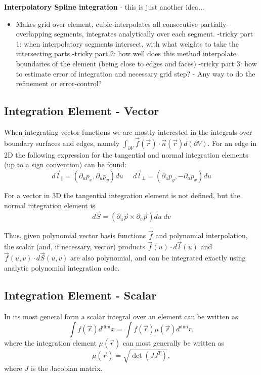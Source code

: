 \noindent
\textbf{Interpolatory Spline integration} - this is just another idea...
\begin{itemize}
	\item Makes grid over element, cubic-interpolates all consecutive partially-overlapping segments, integrates analytically over each segment.
		\subitem -tricky part 1: when interpolatory segments intersect, with what weights to take the intersecting parts
		\subitem -tricky part 2: how well does this method interpolate boundaries of the element (being close to edges and faces)
		\subitem -tricky part 3: how to estimate error of integration and necessary grid step?
		\subitem - Any way to do the refinement or error-control?
\end{itemize}




\subsection{Integration Element - Vector}

When integrating vector functions we are mostly interested in the integrals over boundary surfaces and edges, namely $\int_{\partial V} \vec{f}(\vec{r}) \cdot \vec{n}(\vec{r}) d(\partial V)$. For an edge in 2D the following expression for the tangential and normal integration elements (up to a sign convention) can be found:
\[ d\vec{l}_{\parallel} = (\partial_u p_x, \partial_u p_y)du \; \; \; \; \; d\vec{l}_{\perp} = (\partial_u p_y, -\partial_u p_x)du  \]

\noindent
For a vector in 3D the tangential integration element is not defined, but the normal integration element is
\[ d\vec{S} = (\partial_u \vec{p} \times \partial_v \vec{p})du \; dv  \]

\noindent
Thus, given polynomial vector basis functions $\vec{f}$ and polynomial interpolation, the scalar (and, if necessary, vector) products $\vec{f}(u) \cdot d\vec{l}(u)$ and $\vec{f}(u,v) \cdot d\vec{S}(u,v)$ are also polynomial, and can be integrated exactly using analytic polynomial integration code.




\subsection{Integration Element - Scalar}

In its most general form a scalar integral over an element can be written as \[\int f(\vec{r}) d^{\dim} x = \int f(\vec{r}) \mu(\vec{r}) d^{\dim} r,\] where the integration element $\mu(\vec{r})$ can most generally be written as \[\mu(\vec{r}) = \sqrt{\det(J J^T)},\] where $J$ is the Jacobian matrix. \\

